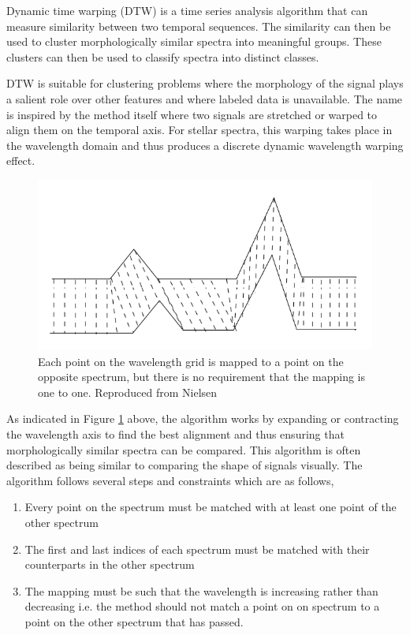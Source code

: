 Dynamic time warping (DTW) is a time series analysis algorithm that can measure similarity between two temporal sequences. The similarity can then be used to cluster morphologically similar spectra into meaningful groups. These clusters can then be used to classify spectra into distinct classes. 

DTW is suitable for clustering problems where the morphology of the signal plays a salient role over other features\cite{nielsen2019practical} and where labeled data is unavailable. The name is inspired by the method itself where two signals are stretched or warped to align them on the temporal axis. For stellar spectra, this warping takes place in the wavelength domain and thus produces a discrete dynamic wavelength warping effect.

\begin{figure}[!htb]
\centering
\includegraphics[scale=1]{figures/Dynamic_time_warping.png}
\caption{Each point on the wavelength grid is mapped to a point on the opposite spectrum, but there is no requirement that the mapping is one to one. Reproduced from Nielsen \cite{nielsen2019practical}}
\label{fig4.1}
\end{figure}

As indicated in Figure \ref{fig4.1} above, the algorithm works by expanding or contracting the wavelength axis to find the best alignment and thus ensuring that morphologically similar spectra can be compared. This algorithm is often described as being similar to comparing the shape of signals visually. The algorithm follows several steps and constraints which are as follows,

\begin{enumerate}
    \item Every point on the spectrum must be matched with at least one point of the other spectrum
    \item The first and last indices of each spectrum must be matched with their counterparts in the other spectrum
    \item The mapping must be such that the wavelength is increasing rather than decreasing i.e. the method should not match a point on on spectrum to a point on the other spectrum that has passed. 
\end{enumerate}

